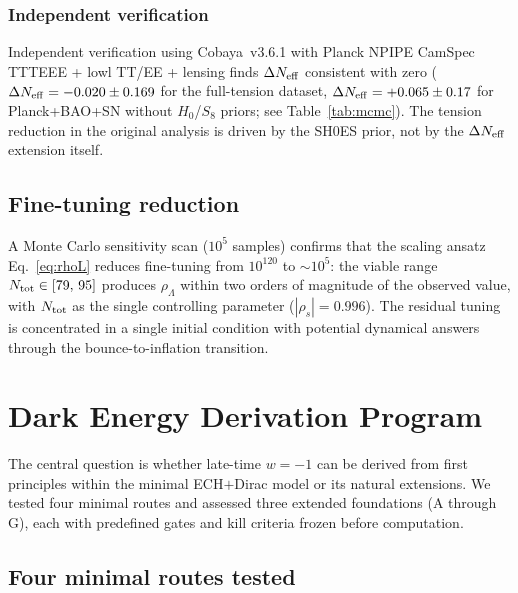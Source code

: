 \documentclass[aps,prd,twocolumn,superscriptaddress,showpacs,preprintnumbers,
  nofootinbib,longbibliography,floatfix]{revtex4-2}
\newcommand{\Neff}{N_{\rm eff}}
\begin{document}
\subsubsection{Independent verification}\label{sec:verification}

Independent verification using Cobaya~v3.6.1 with Planck NPIPE CamSpec
TTTEEE + lowl TT/EE + lensing finds $\Delta\Neff$ consistent with zero
($\Delta\Neff = -0.020 \pm 0.169$ for the full-tension dataset,
$\Delta\Neff = +0.065 \pm 0.17$ for Planck+BAO+SN without $H_0$/$S_8$
priors; see Table~\ref{tab:mcmc}). The tension reduction in the
original analysis is driven by the SH0ES prior, not by the $\Delta\Neff$
extension itself.

\subsection{Fine-tuning reduction}

A Monte Carlo sensitivity scan ($10^5$ samples) confirms that the
scaling ansatz Eq.~\eqref{eq:rhoL} reduces fine-tuning from $10^{120}$
to $\sim\!10^5$: the viable range $N_{\rm tot} \in [79,\,95]$ produces
$\rho_\Lambda$ within two orders of magnitude of the observed value,
with $N_{\rm tot}$ as the single controlling parameter ($|\rho_s| =
0.996$). The residual tuning is concentrated in a single initial
condition with potential dynamical answers through the
bounce-to-inflation transition.



\section{Dark Energy Derivation Program}\label{sec:program}

The central question is whether late-time $w = -1$ can be derived from
first principles within the minimal ECH$+$Dirac model or its natural
extensions. We tested four minimal routes and assessed three extended
foundations (A through G), each with predefined gates and kill criteria
frozen before computation.

\subsection{Four minimal routes tested}\label{sec:routes}
\end{document}
